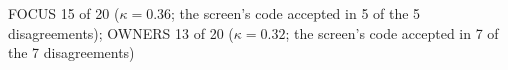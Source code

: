 FOCUS 15 of 20 ($\kappa = 0.36$; the screen's code accepted in 5 of the 5 disagreements); OWNERS 13 of 20 ($\kappa = 0.32$; the screen's code accepted in 7 of the 7 disagreements)